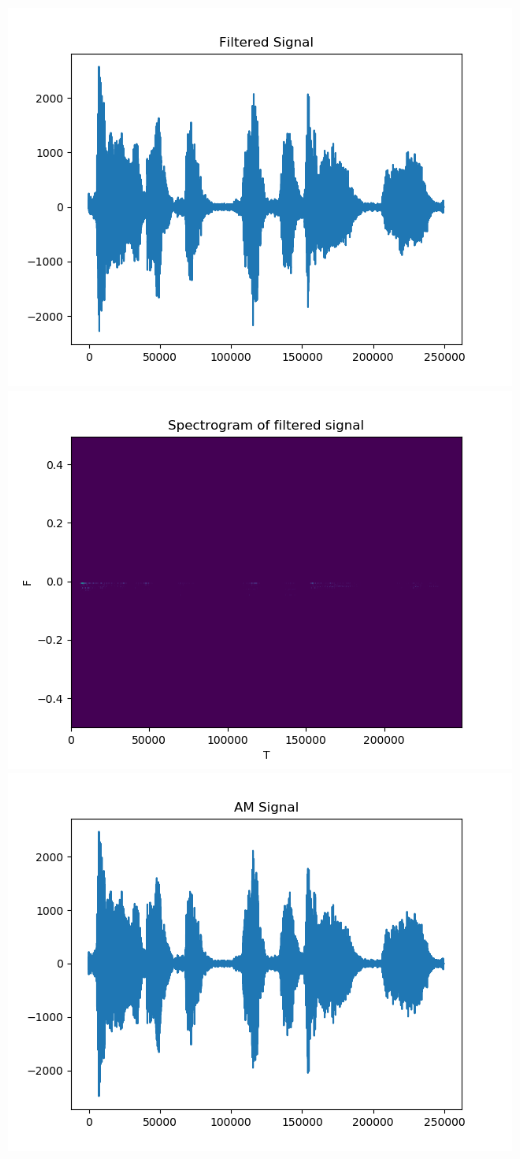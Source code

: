 \documentclass{article}
\begin{document}
	\includegraphics[scale=0.4]{filtered_signal}
	\includegraphics[scale=0.4]{spectogram}
	\includegraphics[scale=0.4]{AMSignal}
\end{document}
